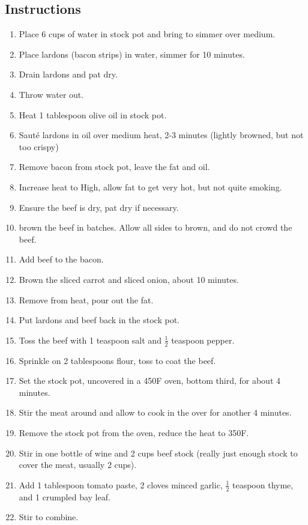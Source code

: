 \begin{multicols}{2}
\subsection*{Instructions}
\begin{enumerate}
    \item Place 6 cups of water in stock pot and bring to simmer over medium.
    \item Place lardons (bacon strips) in water, simmer for 10 minutes.
    \item Drain lardons and pat dry.
    \item Throw water out.
    \item Heat 1 tablespoon olive oil in stock pot.
    \item Sauté lardons in oil over medium heat, 2-3 minutes (lightly browned, but not too crispy)
    \item Remove bacon from stock pot, leave the fat and oil.
    \item Increase heat to High, allow fat to get very hot, but not quite smoking.
    \item Ensure the beef is dry, pat dry if necessary.
    \item brown the beef in batches. Allow all sides to brown, and do not crowd the beef.
    \item Add beef to the bacon.
    \item Brown the sliced carrot and sliced onion, about 10 minutes.
    \item Remove from heat, pour out the fat.
    \item Put lardons and beef back in the stock pot.
    \item Toss the beef with 1 teaspoon salt and \( \frac{1}{2} \) teaspoon pepper.
    \item Sprinkle on 2 tablespoons flour, toss to coat the beef.
    \item Set the stock pot, uncovered in a 450F oven, bottom third, for about 4 minutes.
    \item Stir the meat around and allow to cook in the over for another 4 minutes.
    \item Remove the stock pot from the oven, reduce the heat to 350F.
    \item Stir in one bottle of wine and 2 cups beef stock (really just enough stock to cover the meat, usually 2 cups).
    \item Add 1 tablespoon tomato paste, 2 cloves minced garlic, \( \frac{1}{2} \) teaspoon thyme, and 1 crumpled bay leaf.
    \item Stir to combine.

\end{enumerate}
\end{multicols}
